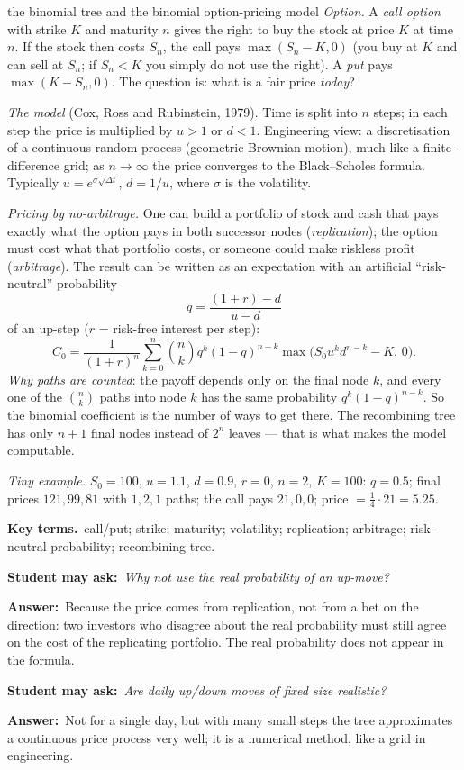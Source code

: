\documentclass[11pt,a4paper,parskip=half]{scrartcl}
\newcommand{\terms}{\par\textbf{\color{plum}Key terms.}\ }
\newcommand{\sq}[1]{\par\textbf{\color{plum}Student may ask:}\ \emph{#1}\par}
\newcommand{\ans}{\textbf{Answer:}\ }
\begin{document}
\begin{bg}{the binomial tree and the binomial option-pricing model}
	\emph{Option.} A \emph{call option} with strike $K$ and maturity $n$ gives
	the right to buy the stock at price $K$ at time $n$. If the stock then
	costs $S_n$, the call pays $\max(S_n-K,0)$ (you buy at $K$ and can sell at
	$S_n$; if $S_n<K$ you simply do not use the right). A \emph{put} pays
	$\max(K-S_n,0)$. The question is: what is a fair price \emph{today}?

	\emph{The model} (Cox, Ross and Rubinstein, 1979). Time is split into $n$
	steps; in each step the price is multiplied by $u>1$ or $d<1$. Engineering
	view: a discretisation of a continuous random process (geometric Brownian
	motion), much like a finite-difference grid; as $n\to\infty$ the price
	converges to the Black--Scholes formula. Typically
	$u = e^{\sigma\sqrt{\Delta t}}$, $d=1/u$, where $\sigma$ is the
	volatility.

	\emph{Pricing by no-arbitrage.} One can build a portfolio of stock and
	cash that pays exactly what the option pays in both successor nodes
	(\emph{replication}); the option must cost what that portfolio costs, or
	someone could make riskless profit (\emph{arbitrage}). The result can be
	written as an expectation with an artificial ``risk-neutral'' probability
	\[ q = \frac{(1+r)-d}{u-d} \]
	of an up-step ($r$ = risk-free interest per step):
	\[ C_0 = \frac{1}{(1+r)^n}\sum_{k=0}^n \binom nk q^k(1-q)^{n-k}
		\max\big(S_0u^kd^{n-k}-K,\,0\big). \]
	\emph{Why paths are counted}: the payoff depends only on the final node
	$k$, and every one of the $\binom nk$ paths into node $k$ has the same
	probability $q^k(1-q)^{n-k}$. So the binomial coefficient is the number of
	ways to get there. The recombining tree has only $n+1$ final nodes instead
	of $2^n$ leaves --- that is what makes the model computable.

	\emph{Tiny example.} $S_0=100$, $u=1.1$, $d=0.9$, $r=0$, $n=2$, $K=100$:
	$q=0.5$; final prices $121, 99, 81$ with $1,2,1$ paths; the call pays
	$21,0,0$; price $= \frac14\cdot21 = 5.25$.

	\terms call/put; strike; maturity; volatility; replication; arbitrage;
	risk-neutral probability; recombining tree.

	\sq{Why not use the real probability of an up-move?}
	\ans Because the price comes from replication, not from a bet on the
	direction: two investors who disagree about the real probability must
	still agree on the cost of the replicating portfolio. The real probability
	does not appear in the formula.

	\sq{Are daily up/down moves of fixed size realistic?}
	\ans Not for a single day, but with many small steps the tree approximates
	a continuous price process very well; it is a numerical method, like a
	grid in engineering.
\end{bg}
\end{document}
